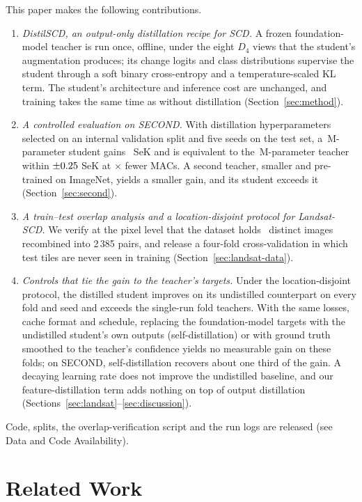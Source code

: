 \documentclass[journal]{IEEEtran}
\begin{document}
This paper makes the following contributions.
\begin{enumerate}
\item \emph{DistilSCD, an output-only distillation recipe for SCD.} A frozen foundation-model
teacher is run once, offline, under the eight $D_4$ views that the student's augmentation
produces; its change logits and class distributions supervise the student through a soft
binary cross-entropy and a temperature-scaled KL term. The student's architecture and
inference cost are unchanged, and training takes the same time as without distillation
(Section~\ref{sec:method}).
\item \emph{A controlled evaluation on SECOND.} With distillation hyperparameters selected on an
internal validation split and five seeds on the test set, a \StudentParams\,M-parameter student
gains \SecFullGain\ SeK and is equivalent to the \TeacherParams\,M-parameter teacher within
$\pm0.25$ SeK at \RatioGmacs$\times$ fewer MACs. A second teacher, smaller and pre-trained on
ImageNet, yields a smaller gain, and its student exceeds it (Section~\ref{sec:second}).
\item \emph{A train--test overlap analysis and a location-disjoint protocol for Landsat-SCD.} We verify at
the pixel level that the dataset holds \LkDistinct\ distinct images recombined into 2\,385
pairs, and release a four-fold cross-validation in which test tiles are never seen in
training (Section~\ref{sec:landsat-data}).
\item \emph{Controls that tie the gain to the teacher's targets.} Under the location-disjoint
protocol, the distilled student improves on its undistilled counterpart on every fold and seed and
exceeds the single-run fold teachers. With the same losses, cache format and schedule, replacing the
foundation-model targets with the undistilled student's own outputs (self-distillation) or with ground
truth smoothed to the teacher's confidence yields no measurable gain on these folds; on SECOND,
self-distillation recovers about one third of the gain. A decaying learning rate does not improve the
undistilled baseline, and our feature-distillation term adds nothing on top of output distillation
(Sections~\ref{sec:landsat}--\ref{sec:discussion}).
\end{enumerate}
Code, splits, the overlap-verification script and the run logs are released (see Data and Code
Availability).

\section{Related Work}
\label{sec:related}
\end{document}
